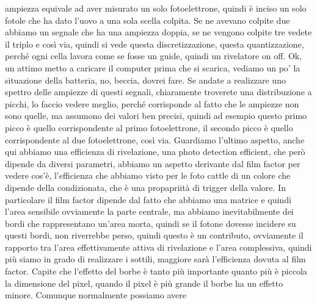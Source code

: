 {ampiezza equivale ad aver misurato un solo fotoelettrone, quindi è inciso un solo fotole che ha dato l'uovo a una sola scella colpita. Se ne avevano colpite due abbiamo un segnale che ha una ampiezza doppia, se ne vengono colpite tre vedete il triplo e così via, quindi si vede questa discretizzazione, questa quantizzazione, perché ogni cella lavora come se fosse un guide, quindi un rivelatore on off. Ok, un attimo metto a caricare il computer prima che si scarica, vediamo un po' la situazione della batteria, no, beccia, dovrei fare. Se andate a realizzare uno spettro delle ampiezze di questi segnali, chiaramente troverete una distribuzione a picchi, lo faccio vedere meglio, perché corrisponde al fatto che le ampiezze non sono quelle, ma assumono dei valori ben precisi, quindi ad esempio questo primo picco è quello corrispondente al primo fotoelettrone, il secondo picco è quello corrispondente al due fotoelettrone, così via. Guardiamo l'ultimo aspetto, anche qui abbiamo una efficienza di rivelazione, una photo detection efficient, che però dipende da diversi parametri, abbiamo un aspetto derivante dal film factor per vedere cos'è, l'efficienza che abbiamo visto per le foto cattle di un colore che dipende della condizionata, che è una propapriità di trigger della valore. In particolare il film factor dipende dal fatto che abbiamo una matrice e quindi l'area sensibile ovviamente la parte centrale, ma abbiamo inevitabilmente dei bordi che rappresentano un'area morta, quindi se il fotone dovesse incidere su questi bordi, non riverrebbe perso, quindi questo è un contributo, ovviamente il rapporto tra l'area effettivamente attiva di rivelazione e l'area complessiva, quindi più siamo in grado di realizzare i sottili, maggiore sarà l'efficienza dovuta al film factor. Capite che l'effetto del borbe è tanto più importante quanto più è piccola la dimensione del pixel, quando il pixel è più grande il borbe ha un effetto minore. Comunque normalmente possiamo avere

}

